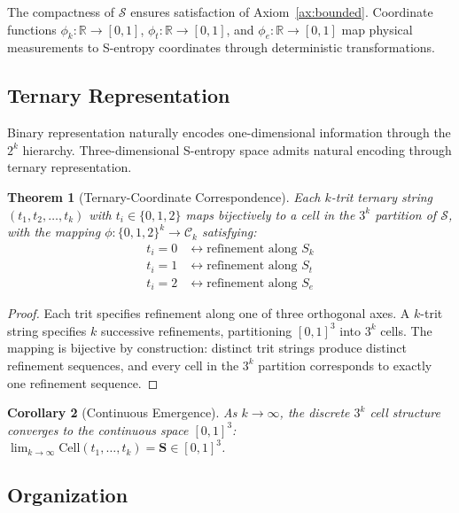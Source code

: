 \documentclass[12pt,a4paper]{article}
\theoremstyle{plain}
\newtheorem{theorem}{Theorem}[section]
\newtheorem{corollary}[theorem]{Corollary}
\theoremstyle{definition}
\theoremstyle{remark}
\newcommand{\Sspace}{\mathcal{S}}
\newcommand{\Sk}{S_k}
\newcommand{\St}{S_t}
\newcommand{\Se}{S_e}
\newcommand{\Scoord}{\mathbf{S}}
\newcommand{\RR}{\mathbb{R}}
\begin{document}
The compactness of $\Sspace$ ensures satisfaction of Axiom~\ref{ax:bounded}. Coordinate functions $\phi_k: \RR \to [0,1]$, $\phi_t: \RR \to [0,1]$, and $\phi_e: \RR \to [0,1]$ map physical measurements to S-entropy coordinates through deterministic transformations.

\subsection{Ternary Representation}

Binary representation naturally encodes one-dimensional information through the $2^k$ hierarchy. Three-dimensional S-entropy space admits natural encoding through ternary representation.

\begin{theorem}[Ternary-Coordinate Correspondence]
\label{thm:ternary}
Each $k$-trit ternary string $(t_1,t_2,\ldots,t_k)$ with $t_i \in \{0,1,2\}$ maps bijectively to a cell in the $3^k$ partition of $\Sspace$, with the mapping $\phi: \{0,1,2\}^k \to \mathcal{C}_k$ satisfying:
\begin{align}
t_i = 0 &\leftrightarrow \text{refinement along } \Sk \\
t_i = 1 &\leftrightarrow \text{refinement along } \St \\
t_i = 2 &\leftrightarrow \text{refinement along } \Se
\end{align}
\end{theorem}

\begin{proof}
Each trit specifies refinement along one of three orthogonal axes. A $k$-trit string specifies $k$ successive refinements, partitioning $[0,1]^3$ into $3^k$ cells. The mapping is bijective by construction: distinct trit strings produce distinct refinement sequences, and every cell in the $3^k$ partition corresponds to exactly one refinement sequence.
\end{proof}

\begin{corollary}[Continuous Emergence]
As $k \to \infty$, the discrete $3^k$ cell structure converges to the continuous space $[0,1]^3$: $\lim_{k \to \infty} \text{Cell}(t_1,\ldots,t_k) = \Scoord \in [0,1]^3$.
\end{corollary}

\subsection{Organization}
\end{document}
